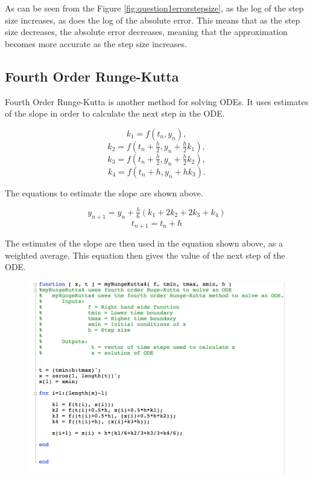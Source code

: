 \documentclass[a4paper]{article}
\begin{document}
As can be seen from the Figure \ref{fig:question1errorstepsize}, as the log of the step size increases, as does the log of the absolute error. This means that as the step size decreases, the absolute error decreases, meaning that the approximation becomes more accurate as the step size increases. 

\subsection{Fourth Order Runge-Kutta}


Fourth Order Runge-Kutta is another method for solving ODEs. It uses estimates of the slope in order to calculate the next step in the ODE. 

$$k_1 = f(t_n, y_n),$$
$$k_2 = f(t_n + \tfrac{h}{2}, y_n + \tfrac{h}{2} k_1),$$
$$k_3 = f(t_n + \tfrac{h}{2}, y_n + \tfrac{h}{2} k_2),$$
$$k_4 = f(t_n + h, y_n + hk_3).$$

The equations to estimate the slope are shown above. 

$$y_{n+1} = y_n + \tfrac{h}{6}\left(k_1 + 2k_2 + 2k_3 + k_4 \right)$$
$$t_{n+1} = t_n + h $$

The estimates of the slope are then used in the equation shown above, as a weighted average. This equation then gives the value of the next step of the ODE.

\begin{figure}[H]
\includegraphics[width=1\textwidth]{myrungekuttacode.jpg}
\end{figure}
\end{document}
